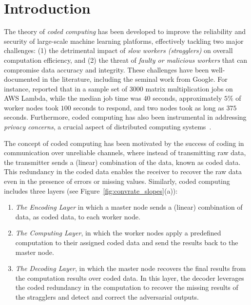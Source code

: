 \documentclass{article}
\begin{document}
\section{Introduction}
The theory of \emph{coded computing} has been developed to improve the reliability and security of large-scale machine learning platforms, effectively tackling two major challenges: (1) the detrimental impact of \emph{slow workers (stragglers)} on overall computation efficiency, and (2) the threat of \emph{faulty or malicious workers} that can compromise data accuracy and integrity.
These challenges have been well-documented in the literature, including the seminal work \cite{dean2013tail} from Google. For instance, \citep{gupta2018oversketch} reported that in a sample set of $3000$ matrix multiplication jobs on AWS Lambda, while the median job time was $40$ seconds, approximately $5\%$ of worker nodes took $100$ seconds to respond, and two nodes took as long as $375$ seconds. Furthermore, coded computing has also been instrumental in addressing \emph{privacy concerns}, a crucial aspect of distributed computing systems~\citep{yu2019lagrange,SoAppxMPC,codedpri,jia2019capacity,aliasgari2019private,kim2019private, chang2019upload, TandonSecMatrix, yu2020straggler,d2020gasp}.


The concept of coded computing has been motivated by the success of coding in communication over unreliable channels, where instead of transmitting raw data, the transmitter sends a (linear) combination of the data, known as coded data. This redundancy in the coded data enables the receiver to recover the raw data even in the presence of errors or missing values. Similarly, coded computing includes three layers \citep{yu2017polynomial,yu2019lagrange,yu2020straggler} (see Figure~\ref{fig:convrate_slopes}(a)):
\begin{enumerate}[label={(\arabic*)}]
\setlength\itemsep{0.1em}
    \item \emph{The Encoding Layer} in which a master node sends a (linear) combination of data,  as coded data, to each worker node. 
    \item \emph{The Computing Layer},
    in which the worker nodes apply a predefined computation to their assigned coded data and send the results back to the master node.

     \item \emph{The Decoding Layer}, in which the master node recovers the final results from the computation results over coded data. In this layer, the decoder leverages the coded redundancy in the computation to recover the missing results of the stragglers and detect and correct the adversarial outputs.  
\end{enumerate}
\end{document}
